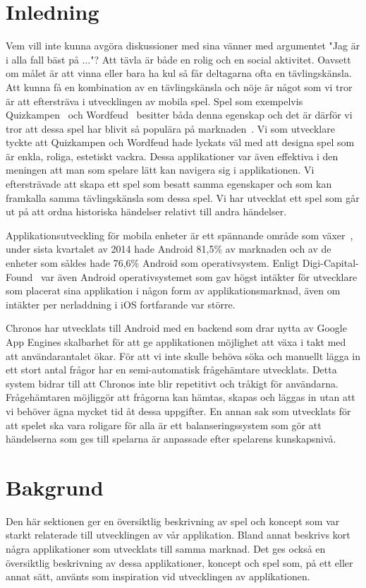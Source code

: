 \documentclass[a4paper, 11pt]{article}
\begin{document}
\section{Inledning}
Vem vill inte kunna avgöra diskussioner med sina vänner med argumentet "Jag är i alla fall bäst på ..."? 
Att tävla är både en rolig och en social aktivitet. Oavsett om målet är att vinna eller bara ha kul så får deltagarna ofta en tävlingskänsla. Att kunna få en kombination av en tävlingskänsla och nöje är något som vi tror är att eftersträva i utvecklingen av mobila spel. Spel som exempelvis Quizkampen~\cite{quiz} och Wordfeud~\cite{wordfeud} besitter båda denna egenskap och det är därför vi tror att dessa spel har blivit så populära på marknaden~\cite{appsalesrating}. Vi som utvecklare tyckte att Quizkampen och Wordfeud hade lyckats väl med att designa spel som är enkla, roliga, estetiskt vackra. Dessa applikationer var även effektiva i den meningen att man som spelare lätt kan navigera sig i applikationen. Vi eftersträvade att skapa ett spel som besatt samma egenskaper och som kan framkalla samma tävlingskänsla som dessa spel. Vi har utvecklat ett spel som går ut på att ordna historiska händelser relativt till andra händelser. 

Applikationsutveckling för mobila enheter är ett spännande område som växer~\cite{IDC}, under sista kvartalet av 2014 hade Android 81,5\% av marknaden och av de enheter som såldes hade 76,6\% Android som operativsystem. Enligt Digi-Capital-Found~\cite{revenue} var även Android operativsystemet som gav högst intäkter för utvecklare som placerat sina applikation i någon form av applikationsmarknad, även om intäkter per nerladdning i iOS fortfarande var större.

Chronos har utvecklats till Android med en backend som drar nytta av Google App Engines skalbarhet för att ge applikationen möjlighet att växa i takt med att användarantalet ökar. För att vi inte skulle behöva söka och manuellt lägga in ett stort antal frågor har en semi-automatisk frågehämtare utvecklats. Detta system bidrar till att Chronos inte blir repetitivt och tråkigt för användarna. Frågehämtaren möjliggör att frågorna kan hämtas, skapas och läggas in utan att vi behöver ägna mycket tid åt dessa uppgifter. En annan sak som utvecklats för att spelet ska vara roligare för alla är ett balanseringssystem som gör att händelserna som ges till spelarna är anpassade efter spelarens kunskapsnivå.


\section{Bakgrund}
Den här sektionen ger en översiktlig beskrivning av spel och koncept som var starkt relaterade till utvecklingen av vår applikation. Bland annat beskrivs kort några applikationer som utvecklats till samma marknad. Det ges också en översiktlig beskrivning av dessa applikationer, koncept och spel som, på ett eller annat sätt, använts som inspiration vid utvecklingen av applikationen. 
\end{document}
